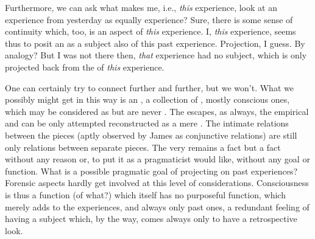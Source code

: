 
Furthermore, we can ask what makes me, i.e., {\em this}  experience,
look at an experience from yesterday as equally  experience?  Sure, there
is some sense of continuity which, too, is an aspect of {\em this} experience.
I, {\em this} experience, seems thus to posit an  as a subject also of
this past experience.  Projection, I guess.  By analogy?  But I was not there
then, {\em that} experience had no subject, which is only projected back from
the  of {\em this} experience.

\pa One can certainly try to connect further and further, but we won't.  What we
possibly might get in this way is an , a collection of ,
mostly conscious ones, which may be considered as  but are never
.  The  escapes, as always, the empirical
 and can be only attempted reconstructed as a mere
.  The intimate relations between the pieces (aptly observed by
James as conjunctive relations) are still only relations between separate
pieces.  The very  remains a fact but
a fact without any reason or, to put it as a pragmaticist would like, without
any goal or function.  What is a possible pragmatic goal of projecting 
on past experiences?  Forensic aspects hardly get involved at this level of
considerations.  Consciousness is thus a function (of what?)  which itself has
no purposeful function, which merely adds to the  experiences, and
always only past ones, a redundant feeling of having a subject which, by the
way, comes always only  to have a retrospective look.


